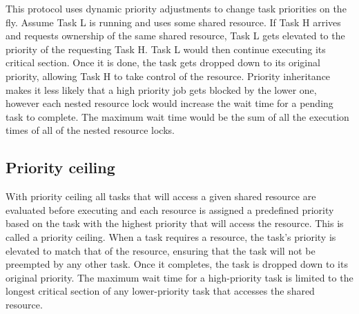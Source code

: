 This protocol uses dynamic priority adjustments to change task priorities on the fly. Assume Task L is running and uses some shared resource. If Task H arrives and requests ownership of the same shared resource, Task L gets elevated to the priority of the requesting Task H. Task L would then continue executing its critical section. Once it is done, the task gets dropped down to its original priority, allowing Task H to take control of the resource. Priority inheritance makes it less likely that a high priority job gets blocked by the lower one, however each nested resource lock would increase the wait time for a pending task to complete. The maximum wait time would be the sum of all the execution times of all of the nested resource locks.

\subsection{Priority ceiling}

With priority ceiling all tasks that will access a given shared resource are evaluated before executing and each resource is assigned a predefined priority based on the task with the highest priority that will access the resource. This is called a priority ceiling. When a task requires a resource, the task's priority is elevated to match that of the resource, ensuring that the task will not be preempted by any other task. Once it completes, the task is dropped down to its original priority. The maximum wait time for a high-priority task is limited to the longest critical section of any lower-priority task that accesses the shared resource.

